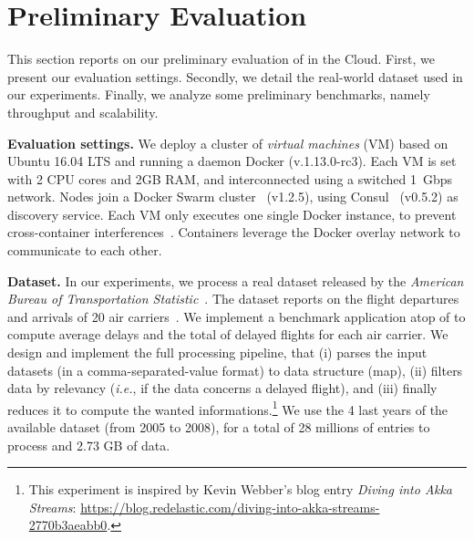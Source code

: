 \section{Preliminary Evaluation}
\label{sec:eval}

This section reports on our preliminary evaluation of \SYS in the Cloud.
First, we present our evaluation settings.
Secondly, we detail the real-world dataset used in our experiments.
Finally, we analyze some preliminary benchmarks, namely throughput and scalability.

\textbf{Evaluation settings.}
We deploy a cluster of \emph{virtual machines} (VM) based on Ubuntu 16.04 LTS and running a daemon Docker (v.1.13.0-rc3).
Each VM is set with 2 CPU cores and 2GB RAM, and interconnected using a switched 1~Gbps network.
Nodes join a Docker Swarm cluster~\cite{docker:swarm_2016} (v1.2.5), using Consul~\cite{consul} (v0.5.2) as discovery service.
Each VM only executes one single Docker instance, to prevent cross-container interferences~\cite{koh2007analysis}.
Containers leverage the Docker overlay network to communicate to each other.

\textbf{Dataset.}
In our experiments, we process a real dataset released by the \emph{American Bureau of Transportation Statistic}~\cite{rita:bts}.
The dataset reports on the flight departures and arrivals of 20 air carriers~\cite{statistical_computing:data}.
We implement a benchmark application atop of \SYS to compute average delays and the total of delayed flights for each air carrier.
We design and implement the full processing pipeline, that (i) parses the input datasets (in a comma-separated-value format) to data structure (\textsf{map}), (ii) filters data by relevancy (\emph{i.e.}, if the data concerns a delayed flight), and (iii) finally reduces it to compute the wanted informations.\footnote{This experiment is inspired by Kevin Webber's blog entry \emph{Diving into Akka Streams}: \url{https://blog.redelastic.com/diving-into-akka-streams-2770b3aeabb0}.}
We use the 4 last years of the available dataset (from 2005 to 2008), for a total of 28 millions of entries to process and 2.73 GB of data.

